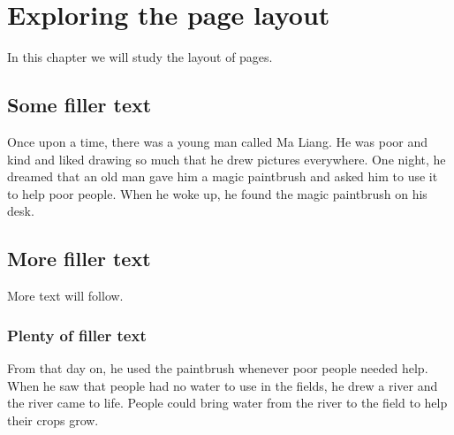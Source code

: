 \documentclass[a4paper,12pt]{book}
\begin{document}
\chapter{Exploring the page layout}
In this chapter we will study the layout of pages.
\section{Some filler text}
Once upon a time, there was a young man called Ma Liang. He was poor and kind and liked drawing so much that he drew pictures everywhere. One night, he dreamed that an old man gave him a magic paintbrush and asked him to use it to help poor people. When he woke up, he found the magic paintbrush on his desk.
\section{More filler text}
More text will follow.
\subsection{Plenty of filler text}
From that day on, he used the paintbrush whenever poor people needed help. When he saw that people had no water to use in the fields, he drew a river and the river came to life. People could bring water from the river to the field to help their crops grow.
\end{document}
